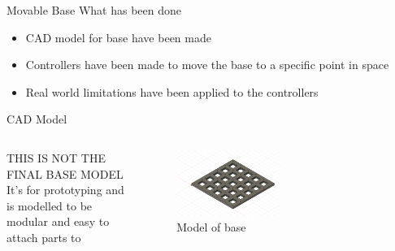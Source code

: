 \documentclass{beamer}
\begin{document}










\begin{frame}{Movable Base}
What has been done\\
\begin{itemize}
    \item CAD model for base have been made
    \item Controllers have been made to move the base to a specific point in space
    \item Real world limitations have been applied to the controllers
\end{itemize}
\end{frame}





\begin{frame}{CAD Model}
\begin{columns}
\begin{column}[]{0.5\textwidth}
THIS IS NOT THE FINAL BASE MODEL\\
It's for prototyping and is modelled to be modular and easy to attach parts to

\end{column}
\begin{column}[]{0.5\textwidth}
\begin{figure}
    \centering
    \includegraphics[width=0.5\textwidth]{img/manbase.png}
    \caption{Model of base}
    \label{fig:my_label}
\end{figure}
\end{column}
\end{columns}
\end{frame}
\end{document}
